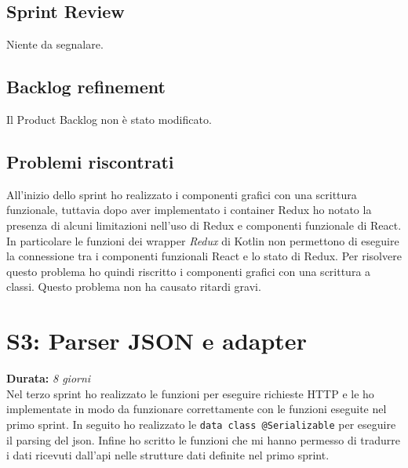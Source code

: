 \subsection{Sprint Review}
Niente da segnalare.

\subsection{Backlog refinement}
Il Product Backlog non è stato modificato.

\subsection{Problemi riscontrati}
All'inizio dello sprint ho realizzato i componenti grafici con una scrittura funzionale, tuttavia dopo aver implementato i container Redux ho notato la presenza di alcuni limitazioni nell'uso di Redux e componenti funzionale di React. In particolare le funzioni dei wrapper \emph{Redux} di Kotlin non permettono di eseguire la connessione tra i componenti funzionali React e lo stato di Redux. Per risolvere questo problema ho quindi riscritto i componenti grafici con una scrittura a classi. Questo problema non ha causato ritardi gravi. 

\newpage

\section{S3: Parser JSON e adapter}
\textbf{Durata:} \textit{8 giorni} \\
Nel terzo sprint ho realizzato le funzioni per eseguire richieste HTTP e le ho implementate in modo da funzionare correttamente con le funzioni eseguite nel primo sprint. In seguito ho realizzato le \verb|data class @Serializable| per eseguire il parsing del json. Infine ho scritto le funzioni che mi hanno permesso di tradurre i dati ricevuti dall'api nelle strutture dati definite nel primo sprint.
 
